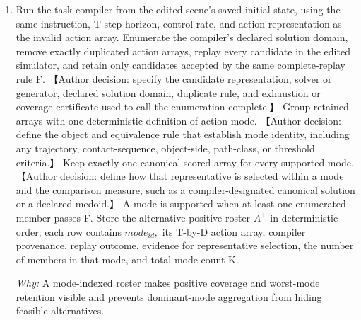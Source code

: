 \documentclass[10pt,a4paper]{article}
\begin{document}
\begin{enumerate}[leftmargin=*,start=1]
  \item Run the task compiler from the edited scene's saved initial state, using the same instruction, T-step horizon, control rate, and action representation as the invalid action array. Enumerate the compiler's declared solution domain, remove exactly duplicated action arrays, replay every candidate in the edited simulator, and retain only candidates accepted by the same complete-replay rule F. 【Author decision: specify the candidate representation, solver or generator, declared solution domain, duplicate rule, and exhaustion or coverage certificate used to call the enumeration complete.】 Group retained arrays with one deterministic definition of action mode. 【Author decision: define the object and equivalence rule that establish mode identity, including any trajectory, contact-sequence, object-side, path-class, or threshold criteria.】 Keep exactly one canonical scored array for every supported mode. 【Author decision: define how that representative is selected within a mode and the comparison measure, such as a compiler-designated canonical solution or a declared medoid.】 A mode is supported when at least one enumerated member passes F. Store the alternative-positive roster \(A^{+}\) in deterministic order;\allowbreak{} each row contains \(mode_{id},\) its T-by-D action array, compiler provenance, replay outcome, evidence for representative selection, the number of members in that mode, and total mode count K.
\par\emph{Why:} A mode-indexed roster makes positive coverage and worst-mode retention visible and prevents dominant-mode aggregation from hiding feasible alternatives.
\end{enumerate}
\end{document}
